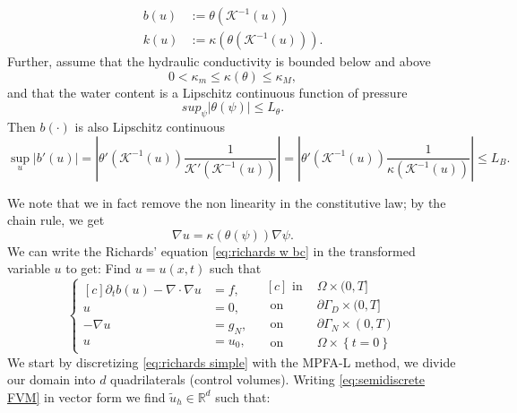\documentclass[../Main/main.tex]{subfiles}
\begin{document}
	\begin{equation}
		\begin{aligned}
			b(u) &:= \theta(\mathcal{K}^{-1}(u))\\
			k(u) &:= \kappa (\theta (\mathcal{K}^{-1}(u))).
		\end{aligned}
	\end{equation}
	Further, assume that the hydraulic conductivity is bounded below and above
	\begin{equation}
		0<\kappa_m \leq \kappa(\theta) \leq \kappa_M,
	\end{equation}
	and that the water content is a Lipschitz continuous function of pressure
	\begin{equation}
		sup_{\psi} |\theta(\psi)|\leq L_{\theta}.
	\end{equation}
	Then $b(\cdot)$ is also Lipschitz continuous
	\begin{equation}
		\sup_{u} |b'(u)| = \left |\theta'(\mathcal{K}^{-1}(u))\frac{1}{\mathcal{K}' (\mathcal{K}^{-1}(u))}\right| = \left  |\theta'(\mathcal{K}^{-1}(u))\frac{1}{\kappa (\mathcal{K}^{-1} (u))}\right|\leq L_B.
	\end{equation}
 	\par
	We note that we in fact remove the non linearity in the constitutive law; by the chain rule, we get
	\begin{equation}
		\nabla u = \kappa(\theta(\psi))\nabla \psi.
	\end{equation}
	We can write the Richards' equation \eqref{eq:richards w bc} in the transformed variable $u$ to get: Find $u=u(x,t)$ such that 
	\begin{equation}\label{eq:richards simple}
	\left \{
	\begin{aligned}[c]
		\partial_t b(u) - \nabla \cdot \nabla u &= f, \\
		u &= 0, \\
		-\nabla u &= g_N,\\
		u &= u_0,
	\end{aligned}
	\ \ \
	\begin{aligned}[c]
		\text{ in }& \Omega \times (0,T]\\
		\text{ on }& \partial \Gamma_D \times (0,T]\\
		\text{ on }& \partial \Gamma_N \times (0,T)\\
		\text{ on }& \Omega \times \left\{t=0\right \}
	\end{aligned}
	\right.
\end{equation}
We start by discretizing \eqref{eq:richards simple} with the MPFA-L method, we divide our domain into $d$ quadrilaterals (control volumes). Writing \eqref{eq:semidiscrete FVM} in vector form we find $\tilde{u}_h \in \mathbb{R}^d$ such that:
\end{document}
